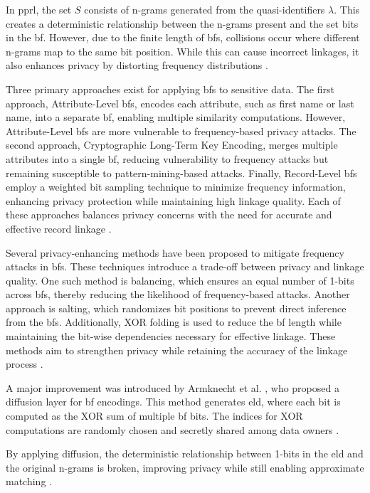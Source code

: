 In \ac{pprl}, the set $S$ consists of n-grams generated from the quasi-identifiers $\lambda$.
This creates a deterministic relationship between the n-grams present and the set bits in the \ac{bf}.
However, due to the finite length of \ac{bf}s, collisions occur where different n-grams map to the same bit position.
While this can cause incorrect linkages, it also enhances privacy by distorting frequency distributions \cite{vidanage2020graph,schaefer2024}.

Three primary approaches exist for applying \ac{bf}s to sensitive data.
The first approach, Attribute-Level \ac{bf}s, encodes each attribute, such as first name or last name, into a separate \ac{bf}, enabling multiple similarity computations.
However, Attribute-Level \ac{bf}s are more vulnerable to frequency-based privacy attacks.
The second approach, Cryptographic Long-Term Key Encoding, merges multiple attributes into a single \ac{bf}, reducing vulnerability to frequency attacks but remaining susceptible to pattern-mining-based attacks.
Finally, Record-Level \ac{bf}s employ a weighted bit sampling technique to minimize frequency information, enhancing privacy protection while maintaining high linkage quality.
Each of these approaches balances privacy concerns with the need for accurate and effective record linkage \cite{vidanage2020graph}.

Several privacy-enhancing methods have been proposed to mitigate frequency attacks in \ac{bf}s.
These techniques introduce a trade-off between privacy and linkage quality.
One such method is balancing, which ensures an equal number of 1-bits across \ac{bf}s, thereby reducing the likelihood of frequency-based attacks.
Another approach is salting, which randomizes bit positions to prevent direct inference from the \ac{bf}s.
Additionally, XOR folding is used to reduce the \ac{bf} length while maintaining the bit-wise dependencies necessary for effective linkage.
These methods aim to strengthen privacy while retaining the accuracy of the linkage process \cite{vidanage2020graph,schaefer2024}.

A major improvement was introduced by Armknecht et al. \cite{armknecht2023strengthening}, who proposed a diffusion layer for \ac{bf} encodings.
This method generates \ac{eld}, where each bit is computed as the XOR sum of multiple \ac{bf} bits.
The indices for XOR computations are randomly chosen and secretly shared among data owners \cite{armknecht2023strengthening}.

By applying diffusion, the deterministic relationship between 1-bits in the \ac{eld} and the original n-grams is broken, improving privacy while still enabling approximate matching \cite{armknecht2023strengthening}.

